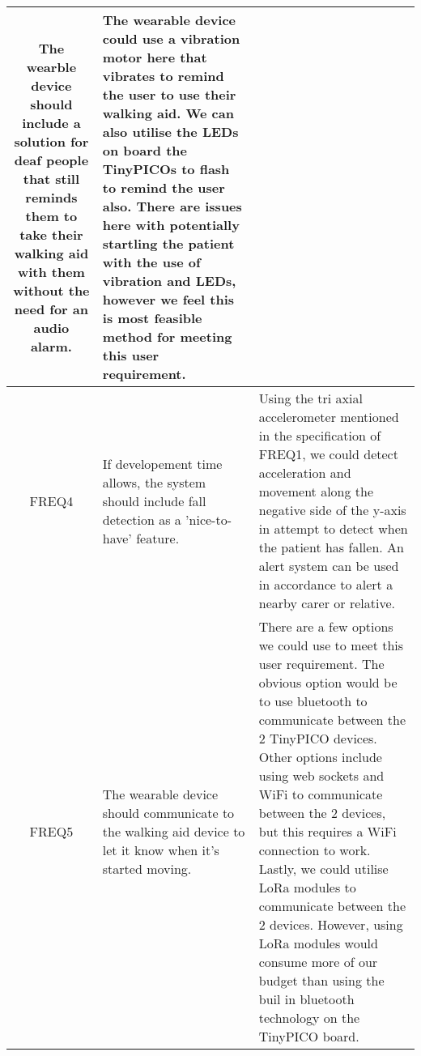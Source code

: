 \begin{xltabular}[H]{\textwidth}{c | X | X}
        The wearble device should include a solution for deaf people that still reminds them to take their walking aid with them without the need for an audio alarm.

        &

        The wearable device could use a vibration motor here that vibrates to remind the user to use their walking aid. We can also utilise the LEDs on board the TinyPICOs to flash to remind the user also. There are issues here with potentially startling the patient with the use of vibration and LEDs, however we feel this is most feasible method for meeting this user requirement.\\

        \midrule

        FREQ4

        &

        If developement time allows, the system should include fall detection as a 'nice-to-have' feature.

        &

        Using the tri axial accelerometer mentioned in the specification of FREQ1, we could detect acceleration and movement along the negative side of the y-axis in attempt to detect when the patient has fallen. An alert system can be used in accordance to alert a nearby carer or relative.\\

        \midrule

        FREQ5

        &

        The wearable device should communicate to the walking aid device to let it know when it's started moving.

        &

        There are a few options we could use to meet this user requirement. The obvious option would be to use bluetooth to communicate between the 2 TinyPICO devices. Other options include using web sockets and WiFi to communicate between the 2 devices, but this requires a WiFi connection to work. Lastly, we could utilise LoRa modules to communicate between the 2 devices. However, using LoRa modules would consume more of our budget than using the buil in bluetooth technology on the TinyPICO board.

	\end{xltabular}
	\label{tbl:func_reqs_table}

